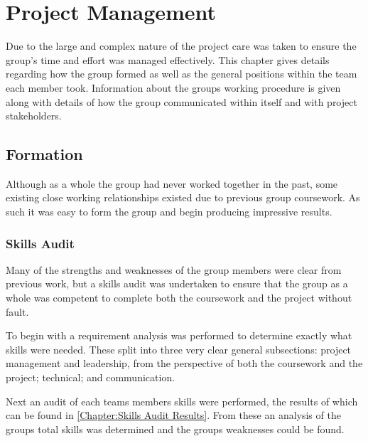 \chapter{Project Management} 
\label{Chapter: Project Management}

\begin{preamble}
Due to the large and complex nature of the project care was taken to ensure the group's time and effort was managed effectively. This chapter gives details regarding how the group formed as well as the general positions within the team each member took. Information about the groups working procedure is given along with details of how the group communicated within itself and with project stakeholders.
\end{preamble}

\section{Formation} 
\label{Section:Formation}

Although as a whole the group had never worked together in the past, some existing close working relationships existed due to previous group coursework. As such it was easy to form the group and begin producing impressive results.

\subsection{Skills Audit} 
\label{Section:Skills Audit}

Many of the strengths and weaknesses of the group members were clear from previous work, but a skills audit was undertaken to ensure that the group as a whole was competent to complete both the coursework and the project without fault.

To begin with a requirement analysis was performed to determine exactly what skills were needed. These split into three very clear general subsections: project management and leadership, from the perspective of both the coursework and the project; technical; and communication. 

Next an audit of each teams members skills were performed, the results of which can be found in \autoref{Chapter:Skills Audit Results}. From these an analysis of the groups total skills was determined and the groups weaknesses could be found.

